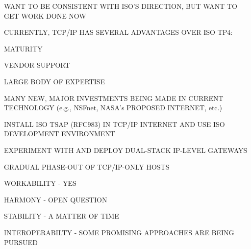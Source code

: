 \begin{bwslide}

\begin{nrtc}
\item	WANT TO BE CONSISTENT WITH ISO'S DIRECTION,
	BUT WANT TO GET WORK DONE NOW

\item	CURRENTLY, TCP/IP HAS SEVERAL ADVANTAGES OVER ISO TP4:
    \begin{nrtc}
    \item	MATURITY
    \item	VENDOR SUPPORT
    \item	LARGE BODY OF EXPERTISE
    \end{nrtc}

\item	MANY NEW, MAJOR INVESTMENTS BEING MADE IN CURRENT TECHNOLOGY
	(e.g., NSFnet, NASA's PROPOSED INTERNET, etc.)
\end{nrtc}
\end{bwslide}


\begin{bwslide}

\begin{nrtc}
\item	INSTALL ISO TSAP (RFC983) IN TCP/IP INTERNET AND USE ISO
	DEVELOPMENT ENVIRONMENT

\item	EXPERIMENT WITH AND DEPLOY DUAL-STACK IP-LEVEL GATEWAYS

\item	GRADUAL PHASE-OUT OF TCP/IP-ONLY HOSTS
\end{nrtc}
\end{bwslide}



\begin{bwslide}

\begin{nrtc}
\item	WORKABILITY - YES

\item	HARMONY - OPEN QUESTION

\item	STABILITY - A MATTER OF TIME

\item	INTEROPERABILTY - SOME PROMISING APPROACHES ARE BEING PURSUED
\end{nrtc}
\end{bwslide}



